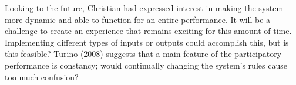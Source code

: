 Looking to the future, Christian had expressed interest in making the system more dynamic and able to function for an entire performance. It will be a challenge to create an experience that remains exciting for this amount of time. Implementing different types of inputs or outputs could accomplish this, but is this feasible? Turino (2008) suggests that a main feature of the participatory performance is constancy; would continually changing the system's rules cause too much confusion?



